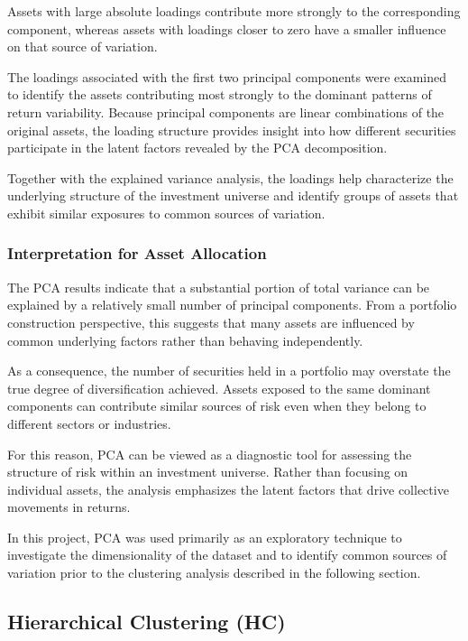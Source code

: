 \documentclass[
  12pt,
  letterpaper,
]{book}
\begin{document}
Assets with large absolute loadings contribute more strongly to the
corresponding component, whereas assets with loadings closer to zero
have a smaller influence on that source of variation.

The loadings associated with the first two principal components were
examined to identify the assets contributing most strongly to the
dominant patterns of return variability. Because principal components
are linear combinations of the original assets, the loading structure
provides insight into how different securities participate in the latent
factors revealed by the PCA decomposition.

Together with the explained variance analysis, the loadings help
characterize the underlying structure of the investment universe and
identify groups of assets that exhibit similar exposures to common
sources of variation.

\subsubsection{Interpretation for Asset
Allocation}\label{interpretation-for-asset-allocation}

The PCA results indicate that a substantial portion of total variance
can be explained by a relatively small number of principal components.
From a portfolio construction perspective, this suggests that many
assets are influenced by common underlying factors rather than behaving
independently.

As a consequence, the number of securities held in a portfolio may
overstate the true degree of diversification achieved. Assets exposed to
the same dominant components can contribute similar sources of risk even
when they belong to different sectors or industries.

For this reason, PCA can be viewed as a diagnostic tool for assessing
the structure of risk within an investment universe. Rather than
focusing on individual assets, the analysis emphasizes the latent
factors that drive collective movements in returns.

In this project, PCA was used primarily as an exploratory technique to
investigate the dimensionality of the dataset and to identify common
sources of variation prior to the clustering analysis described in the
following section.

\subsection{Hierarchical Clustering
(HC)}\label{hierarchical-clustering-hc}
\end{document}
